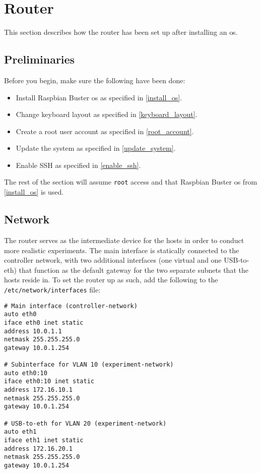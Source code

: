 \chapter{Router}

This section describes how the router has been set up after installing an \gls{os}.

\section{Preliminaries}

Before you begin, make sure the following have been done:

\begin{itemize}
    \item Install Raspbian Buster \gls{os} as specified in \ref{install_os}.
    \item Change keyboard layout as specified in \ref{keyboard_layout}.
    \item Create a root user account as specified in \ref{root_account}.
    \item Update the system as specified in \ref{update_system}.
    \item Enable SSH as specified in \ref{enable_ssh}.
\end{itemize}

The rest of the section will assume \lstinline{root} access and that Raspbian Buster \gls{os} from \ref{install_os} is used.


\section{Network}

The router serves as the intermediate device for the hosts in order to conduct more realistic experiments. The main interface is statically connected to the controller network, with two additional interfaces (one virtual and one USB-to-eth) that function as the default gateway for the two separate subnets that the hosts reside in. To set the router up as such, add the following to the \lstinline{/etc/network/interfaces} file:

\begin{lstlisting}
# Main interface (controller-network)
auto eth0
iface eth0 inet static
address 10.0.1.1
netmask 255.255.255.0
gateway 10.0.1.254

# Subinterface for VLAN 10 (experiment-network)
auto eth0:10
iface eth0:10 inet static
address 172.16.10.1
netmask 255.255.255.0
gateway 10.0.1.254

# USB-to-eth for VLAN 20 (experiment-network)
auto eth1
iface eth1 inet static
address 172.16.20.1
netmask 255.255.255.0
gateway 10.0.1.254
\end{lstlisting}

